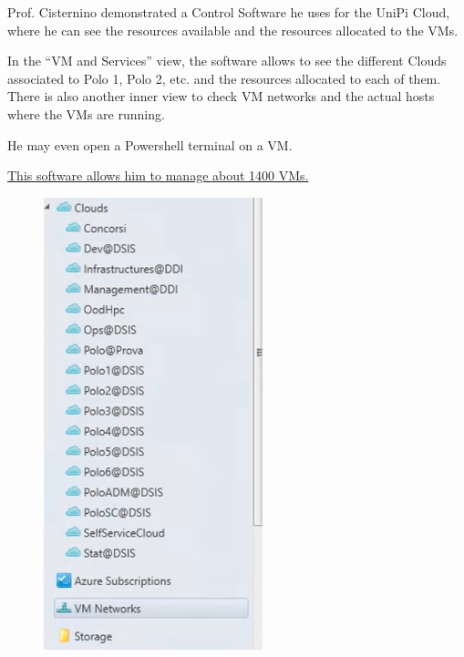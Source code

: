 \begin{paracol}{2}
   \colfill
   Prof. Cisternino demonstrated a Control Software he uses for the UniPi Cloud, where he can see the resources available and the resources allocated to the VMs.
   
   In the ``VM and Services'' view, the software allows to see the different Clouds associated to Polo 1, Polo 2, etc. and the resources allocated to each of them.\\
   There is also another inner view to check VM networks and the actual hosts where the VMs are running.
   
   He may even open a Powershell terminal on a VM.

   \ul{This software allows him to manage about 1400 VMs.}
   \colfill
   \switchcolumn
   \begin{figure}[htbp]
      \centering
      \includegraphics[width=0.45\columnwidth]{images/Control_VMandServices.png}

\end{figure}
\end{paracol}
